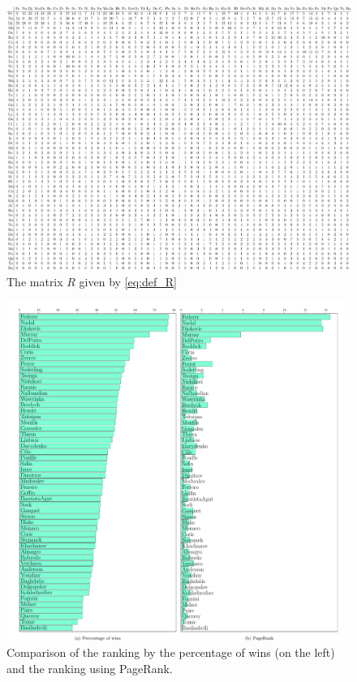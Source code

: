\documentclass[11pt,nocut]{article}
\begin{document}
\begin{figure}
    \centering
	\hspace*{-2cm}
	\includegraphics[width=1.23\textwidth]{./confrontations.pdf}
	\caption{The matrix $R$ given by \eqref{eq:def_R}}
	\label{fig:confrontations}
\end{figure}
\begin{figure}
    \centering
	\hspace*{-2cm}
	\includegraphics[width=1.23\textwidth]{./pagerank_tennis.pdf}
	\caption{Comparison of the ranking by the percentage of wins (on the left) and the ranking using PageRank.}
	\label{fig:ranking}
\end{figure}


\vspace{1cm}
\centerline{}




\end{document}
